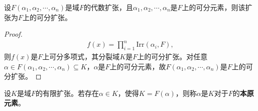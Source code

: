 \documentclass[../../main.tex]{subfiles}%
\begin{document}
\begin{corollary}
设$F(\alpha_1,\alpha_2,\cdots,\alpha_n)$是域$F$的代数扩张，且$\alpha_1,\alpha_2,\cdots,\alpha_n$是$F$上的可分元素，则该扩张为$F$上的可分扩张。
\end{corollary}
\begin{proof}
\begin{align*}
f(x)=\prod\limits_{i=1}^{n}\mathrm{Irr}(\alpha_i,F),
\end{align*}
则$f(x)$是$F$上可分多项式，其分裂域$K$是$F$上的可分扩张。对任意$\alpha\in F(\alpha_1,\alpha_2,\cdots,\alpha_n)\subseteq K$，$\alpha$是$F$上的可分元素，故$F(\alpha_1,\alpha_2,\cdots,\alpha_n)$是$F$上的可分扩张。
\end{proof}

\begin{definition}
设$K$是域$F$的有限扩张。若存在$\alpha\in K$，使得$K=F(\alpha)$，则称$\alpha$是$K$对于$F$的\textbf{本原元素}。
\end{definition}
\end{document}
